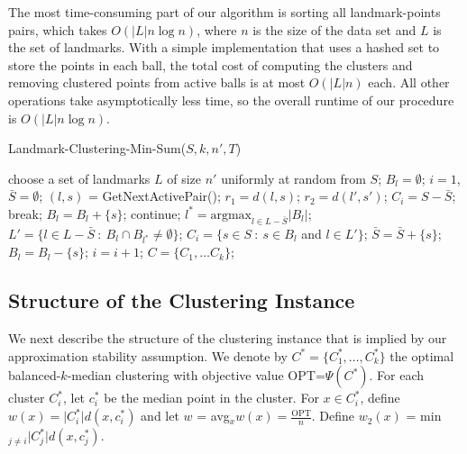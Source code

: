 \documentclass{llncs} \usepackage{algorithm}
\begin{document}
The most time-consuming part of our algorithm is sorting all landmark-points pairs, which takes $O(\vert L \vert n \log n)$, where $n$ is the size of the data set and $L$ is the set of landmarks.  With a simple implementation that uses a hashed set to store the points in each ball, the total cost of computing the clusters and removing clustered points from active balls is at most $O(\vert L \vert n)$ each.  All other operations take asymptotically less time, so the overall runtime of our procedure is $O(\vert L \vert n \log n)$.

\begin{algorithm}[H]
\caption{Landmark-Clustering-Min-Sum($S,k,n',T$)}
\begin{algorithmic}[1]
\STATE choose a set of landmarks $L$ of size $n'$ uniformly at random from $S$;
\STATE $B_{l} = \emptyset$;
\ENDFOR
\STATE $i=1$, $\bar{S} = \emptyset$;
\STATE $(l,s)$ = GetNextActivePair();
\STATE $r_{1} = d(l,s)$;
\STATE $r_{2} = d(l',s')$;
\ELSE
\STATE $C_{i} = S - \bar{S}$;
\STATE break;
\ENDIF
\STATE $B_{l} = B_{l} + \lbrace s \rbrace$;
\STATE continue;
\ENDIF
{}
\STATE $l^{\ast} = \textrm{argmax}_{l \in L - \bar{S}} \vert B_{l} \vert$;
\STATE $L' = \lbrace l \in L - \bar{S} \ \colon \ B_{l} \cap B_{l^{\ast}} \ne \emptyset \rbrace$;
\STATE $C_{i} = \lbrace s \in S \ \colon \ s \in B_{l}$ and $l \in L' \rbrace$;
\STATE $\bar{S} = \bar{S} + \lbrace s \rbrace$;
\STATE $B_{l} = B_{l} - \lbrace s \rbrace$;
\ENDFOR
\ENDFOR
\STATE $i=i+1$;
\ENDWHILE
\ENDWHILE
\RETURN $C = \lbrace C_{1},\ldots C_{k} \rbrace$;
\end{algorithmic}
\label{alg-full}
\end{algorithm}

\subsection{Structure of the Clustering Instance}

We next describe the structure of the clustering instance that is implied by our approximation stability assumption.  We denote by $C^{\ast} = \lbrace C_{1}^{\ast},\ldots,C_{k}^{\ast} \rbrace$ the optimal balanced-$k$-median clustering with objective value OPT=$\Psi(C^{\ast})$.  For each cluster $C_{i}^{\ast}$, let $c_{i}^{\ast}$ be the median point in the cluster.  For $x \in C_{i}^{\ast}$, define $w(x) = \vert C_{i}^{\ast} \vert d(x,c_{i}^{\ast})$ and let $w$ = avg$_{x} w(x) = \frac{\textrm{OPT}}{n}$.  Define $w_{2}(x)$ = min$_{j \ne i} \vert C_{j}^{\ast} \vert d(x,c_{j}^{\ast})$.
\end{document}
